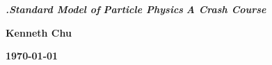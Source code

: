\documentclass[aspectratio=169,handout]{beamer}
\begin{document}
\addtocounter{framenumber}{-1}

\begin{frame}[plain]


\begin{center}

\vskip 2.0cm
\textbf{\fontsize{31}{33}\selectfont\itshape {\color{white}.}Standard Model of}
\vskip 0.40cm
\textbf{\fontsize{41}{43}\selectfont\itshape Particle Physics}
\vskip 0.35cm
\textbf{\fontsize{21}{23}\selectfont\itshape A Crash Course}

\vskip 1.0cm
\textbf{\Large Kenneth Chu}

\vskip 0.5cm
\textbf{\today}

\end{center}

\end{frame}





\appendix


\end{document}
